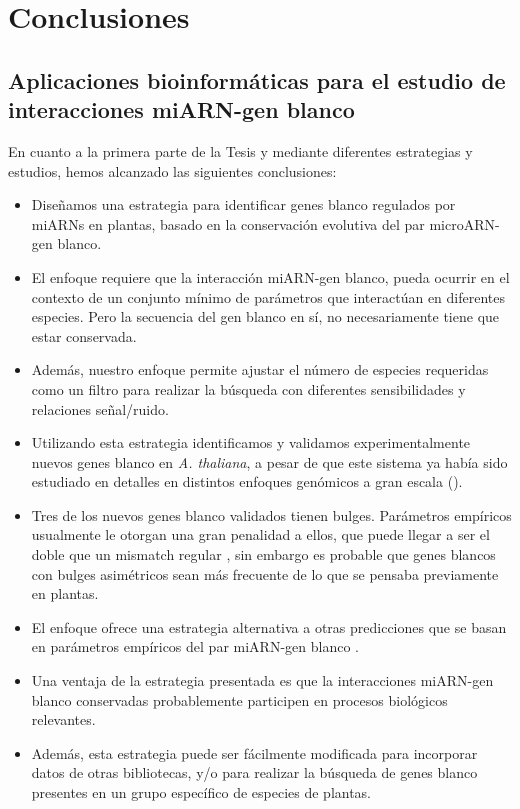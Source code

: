 \setcounter{chapter}{6}
\chapter*{Conclusiones} 


\graphicspath{{Chapter2/Figs/}}


\section{Aplicaciones bioinformáticas para el estudio de interacciones miARN-gen blanco}

En cuanto a la primera parte de la Tesis y mediante diferentes estrategias y estudios, hemos alcanzado las siguientes conclusiones:

\begin{itemize}
    \item Diseñamos una estrategia para identificar genes blanco regulados por miARNs en plantas, basado en la conservación evolutiva del par microARN-gen blanco.
    \item El enfoque requiere que la interacción miARN-gen blanco, pueda ocurrir en el contexto de un conjunto mínimo de parámetros que interactúan en diferentes especies. Pero la secuencia del gen blanco en sí, no necesariamente tiene que estar conservada.
    \item Además, nuestro enfoque permite ajustar el número de especies requeridas como un filtro para realizar la búsqueda con diferentes sensibilidades y relaciones señal/ruido.
    \item Utilizando esta estrategia identificamos y validamos experimentalmente nuevos genes blanco en \textit{A. thaliana}, a pesar de que este sistema ya había sido estudiado en detalles en distintos enfoques genómicos a gran escala (\citep{Allen2005207,JonesRhoades2004787,Addo-quaye2009a,German2008,Rajagopalan2006,Schwab2005517}).
    \item Tres de los nuevos genes blanco validados tienen bulges. Parámetros empíricos usualmente le otorgan una gran penalidad a ellos, que puede llegar a ser el doble que un mismatch regular \citep{JonesRhoades2004787}, 
    sin embargo es probable que genes blancos con bulges asimétricos sean más frecuente de lo que se pensaba previamente en plantas.
    \item El enfoque ofrece una estrategia alternativa a otras predicciones que se basan en parámetros empíricos del par miARN-gen blanco \citep{Allen2005207,JonesRhoades2004787,citeulike:8816489,Fahlgren_chapter}.
    \item Una ventaja de la estrategia presentada es que la interacciones miARN-gen blanco conservadas probablemente participen en procesos biológicos relevantes.
    \item Además, esta estrategia puede ser fácilmente modificada para incorporar datos de otras bibliotecas, y/o para realizar la búsqueda de genes blanco presentes en un grupo específico de especies de plantas.
\end{itemize}

